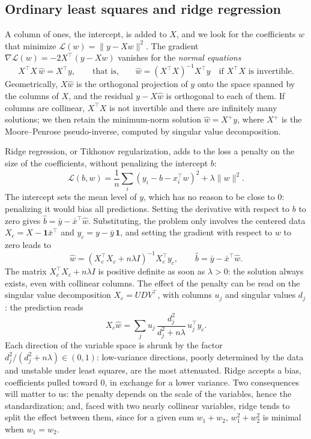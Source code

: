 \documentclass[11pt,a4paper]{article}
\begin{document}
\subsection{Ordinary least squares and ridge regression}\label{sec:ridge}

A column of ones, the intercept, is added to $X$, and we look for the coefficients $w$ that minimize
$\mathcal{L}(w) = \lVert y - Xw\rVert^2$. The gradient $\nabla\mathcal{L}(w) = -2X^\top(y - Xw)$ vanishes for the
\emph{normal equations}
\[
X^\top X\,\hat w = X^\top y, \qquad \text{that is,} \qquad \hat w = (X^\top X)^{-1}X^\top y
\quad \text{if } X^\top X \text{ is invertible.}
\]
Geometrically, $X\hat w$ is the orthogonal projection of $y$ onto the space spanned by the columns of $X$, and the
residual $y - X\hat w$ is orthogonal to each of them. If columns are collinear, $X^\top X$ is not invertible and there
are infinitely many solutions; we then retain the minimum-norm solution $\hat w = X^+ y$, where $X^+$ is the
Moore--Penrose pseudo-inverse, computed by singular value decomposition.

Ridge regression, or Tikhonov regularization, adds to the loss a penalty on the size of the coefficients, without
penalizing the intercept $b$:
\[
\mathcal{L}(b, w) = \frac1n\sum_i (y_i - b - x_i^\top w)^2 + \lambda\lVert w\rVert^2 .
\]
The intercept sets the mean level of $y$, which has no reason to be close to 0: penalizing it would bias all
predictions. Setting the derivative with respect to $b$ to zero gives $\hat b = \bar y - \bar x^\top \hat w$.
Substituting, the problem only involves the centered data $X_c = X - \mathbf{1}\bar x^\top$ and
$y_c = y - \bar y\,\mathbf{1}$, and setting the gradient with respect to $w$ to zero leads to
\[
\hat w = (X_c^\top X_c + n\lambda I)^{-1}X_c^\top y_c,\qquad \hat b = \bar y - \bar x^\top \hat w.
\]
The matrix $X_c^\top X_c + n\lambda I$ is positive definite as soon as $\lambda > 0$: the solution always exists, even
with collinear columns. The effect of the penalty can be read on the singular value decomposition $X_c = UDV^\top$,
with columns $u_j$ and singular values $d_j$: the prediction reads
\[
X_c\hat w = \sum_j u_j\, \frac{d_j^2}{d_j^2 + n\lambda}\, u_j^\top y_c .
\]
Each direction of the variable space is shrunk by the factor $d_j^2/(d_j^2 + n\lambda) \in (0, 1)$: low-variance
directions, poorly determined by the data and unstable under least squares, are the most attenuated. Ridge accepts a
bias, coefficients pulled toward 0, in exchange for a lower variance. Two consequences will matter to us: the penalty
depends on the scale of the variables, hence the standardization; and, faced with two nearly collinear variables,
ridge tends to split the effect between them, since for a given sum $w_1 + w_2$, $w_1^2 + w_2^2$ is minimal when
$w_1 = w_2$.
\end{document}

